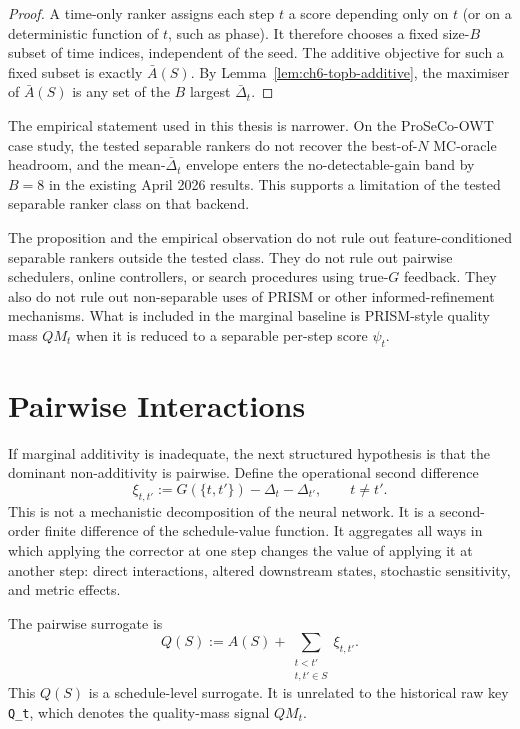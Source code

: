 \begin{proof}
A time-only ranker assigns each step $t$ a score depending only on $t$ (or on a
deterministic function of $t$, such as phase). It therefore chooses a fixed
size-$B$ subset of time indices, independent of the seed. The additive
objective for such a fixed subset is exactly $\bar A(S)$. By
Lemma~\ref{lem:ch6-topb-additive}, the maximiser of $\bar A(S)$ is any set of
the $B$ largest $\bar\Delta_t$.
\end{proof}

The empirical statement used in this thesis is narrower. On the ProSeCo-OWT
case study, the tested separable rankers do not recover the best-of-$N$
MC-oracle headroom, and the mean-$\bar\Delta_t$ envelope enters the
no-detectable-gain band by $B=8$ in the existing April 2026 results. This
supports a limitation of the tested separable ranker class on that backend.

The proposition and the empirical observation do not rule out
feature-conditioned separable rankers outside the tested class. They do not
rule out pairwise schedulers, online controllers, or search procedures using
true-$G$ feedback. They also do not rule out non-separable uses of PRISM or
other informed-refinement mechanisms. What is included in the marginal
baseline is PRISM-style quality mass $QM_t$ when it is reduced to a separable
per-step score $\psi_t$.

\section{Pairwise Interactions}
\label{sec:ch6-pairwise-interactions}

If marginal additivity is inadequate, the next structured hypothesis is that
the dominant non-additivity is pairwise. Define the operational second
difference
\[
  \xi_{t,t'}
  := G(\{t,t'\})-\Delta_t-\Delta_{t'},
  \qquad t\ne t' .
\]
This is not a mechanistic decomposition of the neural network. It is a
second-order finite difference of the schedule-value function. It aggregates
all ways in which applying the corrector at one step changes the value of
applying it at another step: direct interactions, altered downstream states,
stochastic sensitivity, and metric effects.

The pairwise surrogate is
\[
  Q(S)
  :=
  A(S)
  +
  \sum_{\substack{t<t'\\ t,t'\in S}}
  \xi_{t,t'} .
\]
This $Q(S)$ is a schedule-level surrogate. It is unrelated to the historical
raw key \texttt{Q\_t}, which denotes the quality-mass signal $QM_t$.

